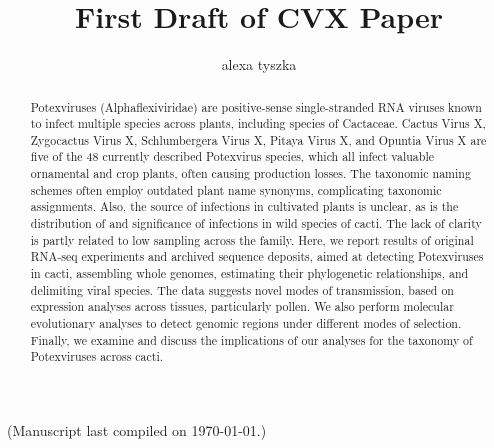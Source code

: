 \documentclass{article}
\title{First Draft of CVX Paper}
\author{alexa tyszka}
\date{}
\begin{document}


\maketitle

(Manuscript last compiled on \today.)


\begin{abstract}

Potexviruses (Alphaflexiviridae) are positive-sense single-stranded RNA viruses known to infect multiple species across plants, including species of Cactaceae. 
Cactus Virus X, Zygocactus Virus X, Schlumbergera Virus X, Pitaya Virus X, and Opuntia Virus X are five of the 48 currently described Potexvirus species, which all infect valuable ornamental and crop plants, often causing production losses. 
The taxonomic naming schemes often employ outdated plant name synonyms, complicating taxonomic assignments. Also, the source of infections in cultivated plants is unclear, as is the distribution of and significance of infections in wild species of cacti. 
The lack of clarity is partly related to low sampling across the family. 
Here, we report results of original RNA-seq experiments and archived sequence deposits, aimed at detecting Potexviruses in cacti, assembling whole genomes, estimating their phylogenetic relationships, and delimiting viral species. 
The data suggests novel modes of transmission, based on expression analyses across tissues, particularly pollen. 
We also perform molecular evolutionary analyses to detect genomic regions under different modes of selection. 
Finally, we examine and discuss the implications of our analyses for the taxonomy of Potexviruses across cacti.  
\end{abstract}
\end{document}
